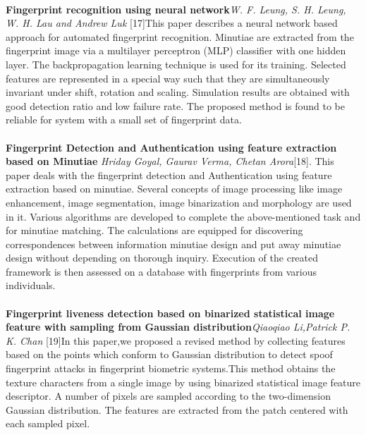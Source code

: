 \documentclass[a4paper,12pt,oneside]{article}
\begin{document}
\paragraph{}
\textbf{Fingerprint recognition using neural network}\textit{W. F. Leung, S. H. Leung, W. H. Lau and Andrew Luk }[17]This paper describes a neural network based approach for automated
fingerprint recognition. Minutiae are extracted from the fingerprint image via a multilayer perceptron (MLP) classifier with one hidden layer. The backpropagation learning technique is used for its training. Selected features are represented in a special way such that they are simultaneously invariant under shift, rotation and scaling. Simulation results are obtained with good detection ratio and low failure rate. The proposed method is found to be reliable for system with a small set of fingerprint data. 



\paragraph{}
\textbf{ Fingerprint Detection and Authentication using feature extraction based on Minutiae }\textit{
Hriday Goyal, Gaurav Verma, Chetan Arora}[18]. This paper deals with the fingerprint
detection and Authentication using feature extraction based on
minutiae. Several concepts of image processing like image
enhancement, image segmentation, image binarization and
morphology are used in it. Various algorithms are developed to
complete the above-mentioned task and for minutiae matching.
The calculations are equipped for discovering correspondences
between information minutiae design and put away minutiae
design without depending on thorough inquiry. Execution of the
created framework is then assessed on a database with
fingerprints from various individuals.

\paragraph{}
\textbf{Fingerprint liveness detection based on binarized statistical image feature with sampling from Gaussian distribution}\textit{Qiaoqiao Li,Patrick P. K. Chan }[19]In this paper,we proposed a revised method by collecting features based on the points which conform to Gaussian
distribution to detect spoof fingerprint attacks in
fingerprint biometric systems.This method obtains the
texture characters from a single image by using binarized
statistical image feature descriptor. A number of pixels are
sampled according to the two-dimension Gaussian
distribution. The features are extracted from the patch
centered with each sampled pixel.
\end{document}
